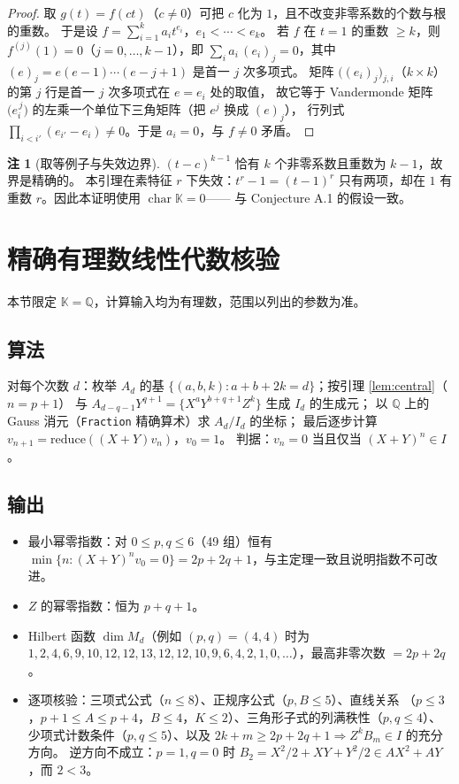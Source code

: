 \documentclass[11pt,UTF8]{ctexart}
\theoremstyle{definition}
\newtheorem{remark}[theorem]{注}
\newcommand{\chr}{\operatorname{char}}
\newcommand{\Q}{\mathbb{Q}}
\newcommand{\K}{\mathbb{K}}
\begin{document}
\begin{proof}
取 $g(t)=f(ct)$（$c\ne0$）可把 $c$ 化为 $1$，且不改变非零系数的个数与根的重数。
于是设 $f=\sum_{i=1}^{k}a_it^{e_i}$，$e_1<\cdots<e_k$。
若 $f$ 在 $t=1$ 的重数 $\ge k$，则 $f^{(j)}(1)=0$（$j=0,\dots,k-1$），即
$\sum_i a_i\,(e_i)_j=0$，其中 $(e)_j=e(e-1)\cdots(e-j+1)$ 是首一 $j$ 次多项式。
矩阵 $\bigl((e_i)_j\bigr)_{j,i}$（$k\times k$）的第 $j$ 行是首一 $j$ 次多项式在 $e=e_i$ 处的取值，
故它等于 Vandermonde 矩阵 $\bigl(e_i^{\,j}\bigr)$ 的左乘一个单位下三角矩阵（把 $e^j$ 换成 $(e)_j$），
行列式 $\prod_{i<i'}(e_{i'}-e_i)\ne0$。于是 $a_i=0$，与 $f\ne0$ 矛盾。
\end{proof}

\begin{remark}[取等例子与失效边界]
$(t-c)^{k-1}$ 恰有 $k$ 个非零系数且重数为 $k-1$，故界是精确的。
本引理在素特征 $r$ 下失效：$t^r-1=(t-1)^r$ 只有两项，却在 $1$ 有重数 $r$。因此本证明使用 $\chr\K=0$——
与 Conjecture A.1 的假设一致。
\end{remark}

\section{精确有理数线性代数核验}\label{sec:linear-algebra}

本节限定 $\K=\Q$，计算输入均为有理数，范围以列出的参数为准。

\subsection{算法}
对每个次数 $d$：枚举 $A_d$ 的基 $\{(a,b,k):a+b+2k=d\}$；按引理 \ref{lem:central}（$n=p+1$）
与 $A_{d-q-1}Y^{q+1}=\{X^aY^{b+q+1}Z^k\}$ 生成 $I_d$ 的生成元；
以 $\Q$ 上的 Gauss 消元（\texttt{Fraction} 精确算术）求 $A_d/I_d$ 的坐标；
最后逐步计算 $v_{n+1}=\mathrm{reduce}((X+Y)v_n)$，$v_0=1$。
判据：$v_n=0$ 当且仅当 $(X+Y)^n\in I$。

\subsection{输出}
\begin{itemize}[leftmargin=2em]
\item 最小幂零指数：对 $0\le p,q\le6$（49 组）恒有
$\min\{n:(X+Y)^nv_0=0\}=2p+2q+1$，与主定理一致且说明指数不可改进。
\item $Z$ 的幂零指数：恒为 $p+q+1$。
\item Hilbert 函数 $\dim M_d$（例如 $(p,q)=(4,4)$ 时为
$1,2,4,6,9,10,12,12,13,12,12,10,9,6,4,2,1,0,\dots$），最高非零次数 $=2p+2q$。
\item 逐项核验：三项式公式（$n\le8$）、正规序公式（$p,B\le5$）、直线关系
（$p\le3$，$p+1\le A\le p+4$，$B\le4$，$K\le2$）、三角形子式的列满秩性（$p,q\le4$）、
少项式计数条件（$p,q\le5$）、以及 $2k+m\ge2p+2q+1\Rightarrow Z^kB_m\in I$ 的充分方向。
逆方向不成立：$p=1,q=0$ 时 $B_2=X^2/2+XY+Y^2/2\in AX^2+AY$，而 $2<3$。
\end{itemize}
\end{document}

